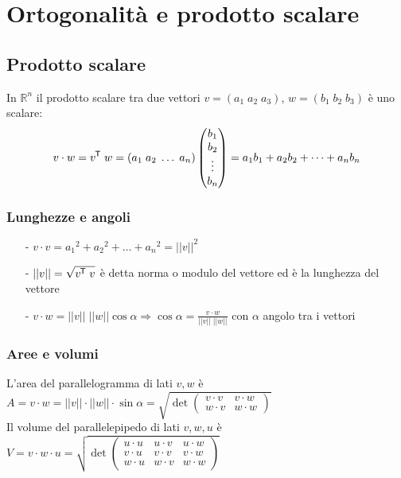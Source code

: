 \documentclass[a4paper]{article}
\newcommand\tran{^{\mkern-1.5mu\mathsf{T}}} %
\begin{document}
\newpage


\section{Ortogonalità e prodotto scalare}
\subsection{Prodotto scalare}
In \(\mathbb{R}^n\) il prodotto scalare tra due vettori \(v = (a_1 \; a_2 \; a_3)\), \(w = (b_1 \; b_2 \; b_3)\) è uno scalare:
\[v \cdot w = v \tran \; w =(a_1 \; a_2 \; \dots \; a_n) \left(\begin{matrix} b_1 \\ b_2 \\ \vdots \\ b_n \end{matrix}\right) = a_1b_1 + a_2b_2 + \dots + a_nb_n\]

\subsubsection*{Lunghezze e angoli}
\begin{itemize}[topsep=3pt, itemsep=0pt]
	\item[-] \(v \cdot v = {a_1}^2 + {a_2}^2 + \dots + {a_n}^2 = ||v||^2\)
	\item[-] \(||v|| = \sqrt{v \tran \; v}\) è detta norma o modulo del vettore ed è la lunghezza del vettore
	\item[-] \(v \cdot w = ||v|| \; ||w|| \cos \alpha \Rightarrow \cos \alpha = \displaystyle \frac{v \cdot w}{||v|| \; ||w||}\) con \(\alpha\) angolo tra i vettori
\end{itemize}

\subsubsection*{Aree e volumi}
L'area del parallelogramma di lati \(v, w\) è \(A = v \cdot w = ||v|| \cdot ||w|| \cdot \sin \alpha = \sqrt{\det \left( \begin{matrix} v \cdot v & v \cdot w \\ w \cdot v & w \cdot w \end{matrix} \right)}\) \\
Il volume del parallelepipedo di lati \(v, w, u\) è \(V = v \cdot w \cdot u = \sqrt{ \det \left( \begin{matrix} u \cdot u & u \cdot v & u \cdot w \\ v \cdot u & v \cdot v & v \cdot w \\ w \cdot u & w \cdot v & w \cdot w \end{matrix} \right)}\)
\end{document}
